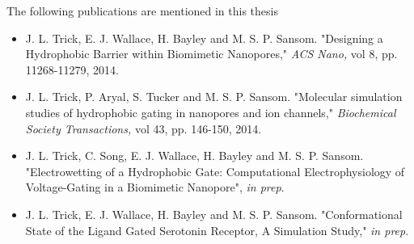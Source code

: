 \begin{publications}

The following publications are mentioned in this thesis

\begin{itemize}
\item J. L. Trick, E. J. Wallace, H. Bayley and M. S. P. Sansom. "Designing a Hydrophobic Barrier within Biomimetic Nanopores," \textit{ACS Nano,} vol 8, pp. 11268-11279, 2014. 
\item J. L. Trick, P. Aryal, S. Tucker and M. S. P. Sansom. "Molecular simulation studies of hydrophobic gating in nanopores and ion channels," \textit{Biochemical Society Transactions,} vol 43, pp. 146-150, 2014.
\item J. L. Trick, C. Song, E. J. Wallace, H. Bayley and M. S. P. Sansom. "Electrowetting of a Hydrophobic Gate: Computational Electrophysiology of Voltage-Gating in a Biomimetic Nanopore", \textit{in prep}.
\item J. L. Trick, E. J. Wallace, H. Bayley and M. S. P. Sansom. "Conformational State of the Ligand Gated Serotonin Receptor, A Simulation Study," \textit{in prep}.
\end{itemize}

\end{publications}
